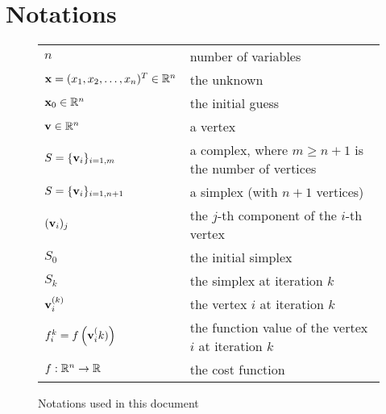 \chapter*{Notations}


\begin{figure}[h]
\begin{center}
\begin{tabular}{|l|l|}
\hline
$n$ & number of variables\\
$\mathbf{x}=(x_1,x_2,\ldots,x_n)^T \in\mathbb{R}^n$ & the unknown\\
$\mathbf{x}_0\in\mathbb{R}^n$ & the initial guess\\
$\mathbf{v}\in\mathbb{R}^n$ & a vertex\\
$S=\{\mathbf{v}_i\}_{i=1,m}$ & a complex, where $m\geq n+1$ is the number of vertices\\
$S=\{\mathbf{v}_i\}_{i=1,n+1}$ & a simplex (with $n+1$ vertices)\\
$(\mathbf{v}_i)_j$ & the $j$-th component of the $i$-th vertex\\
$S_0$& the initial simplex\\
$S_k$& the simplex at iteration $k$\\
$\mathbf{v}_i^{(k)}$& the vertex $i$ at iteration $k$\\
$f^k_i = f\left( \mathbf{v}_i^(k) \right)$& the function value of the vertex $i$ at iteration $k$\\
$f:\mathbb{R}^n\rightarrow\mathbb{R}$& the cost function\\
\hline
\end{tabular}
\end{center}
\caption{Notations used in this document}
\label{fig-notations}
\end{figure}

